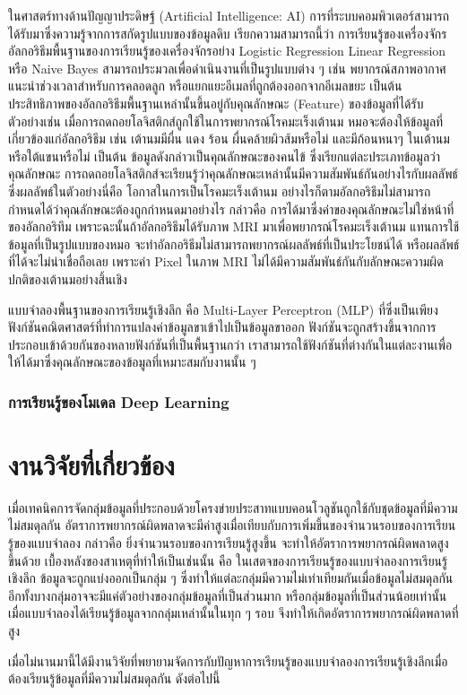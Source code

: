 ในศาสตร์ทางด้านปัญญาประดิษฐ์ (Artificial Intelligence: AI) การที่ระบบคอมพิวเตอร์สามารถได้รับมาซึ่งความรู้จากการสกัดรูปแบบของข้อมูลดิบ 
เรียกความสามารถนี้ว่า การเรียนรู้ของเครื่องจักร อัลกอริธึมพื้นฐานของการเรียนรู้ของเครื่องจักรอย่าง Logistic Regression 
Linear Regression หรือ Naive Bayes สามารถประมวลเพื่อดำเนินงานที่เป็นรูปแบบต่าง ๆ เช่น พยากรณ์สภาพอากาศ 
แนะนำช่วงเวลาสำหรับการคลอดลูก หรือแยกแยะอีเมลที่ถูกต้องออกจากอีเมลขยะ เป็นต้น ประสิทธิภาพของอัลกอริธึมพื้นฐานเหล่านั้นขึ้นอยู่กับคุณลักษณะ (Feature) ของข้อมูลที่ได้รับ ตัวอย่างเช่น เมื่อการถดถอยโลจิสติกส์ถูกใช้ในการพยากรณ์โรคมะเร็งเต้านม หมอจะต้องให้ข้อมูลที่เกี่ยวข้องแก่อัลกอริธึม 
เช่น เต้านมมีผื่น แดง ร้อน ผื่นคล้ายผิวส้มหรือไม่ และมีก้อนหนาๆ ในเต้านมหรือใต้แขนหรือไม่ เป็นต้น ข้อมูลดังกล่าวเป็นคุณลักษณะของคนไข้ 
ซึ่งเรียกแต่ละประเภทข้อมูลว่า คุณลักษณะ การถดถอยโลจิสติกส์จะเรียนรู้ว่าคุณลักษณะเหล่านั้นมีความสัมพันธ์กันอย่างไรกับผลลัพธ์ ซึ่งผลลัพธ์ในตัวอย่างนี่คือ 
โอกาสในการเป็นโรคมะเร็งเต้านม อย่างไรก็ตามอัลกอริธึมไม่สามารถกำหนดได้ว่าคุณลักษณะต้องถูกกำหนดมาอย่างไร กล่าวคือ 
การได้มาซึ่งค่าของคุณลักษณะไม่ใช่หน้าที่ของอัลกอริทึม เพราะฉะนั้นถ้าอัลกอริธึมได้รับภาพ MRI มาเพื่อพยากรณ์โรคมะเร็งเต้านม แทนการใช้ข้อมูลที่เป็นรูปแบบของหมอ 
จะทำอัลกอริธีมไม่สามารถพยากรณ์ผลลัพธ์ที่เป็นประโยชน์ได้ หรือผลลัพธ์ที่ได้จะไม่น่าเชื่อถือเลย เพราะค่า Pixel ในภาพ MRI 
ไม่ได้มีความสัมพันธ์กันกับลักษณะความผิดปกติของเต้านมอย่างสิ้นเชิง

แบบจำลองพื้นฐานของการเรียนรู้เชิงลึก คือ Multi-Layer Perceptron (MLP) ที่ซึ่งเป็นเพียงฟังก์ชันคณิตศาสตร์ที่ทำการแปลงค่าข้อมูลขาเข้าไปเป็นข้อมูลขาออก ฟังก์ชันจะถูกสร้างขึ้นจากการประกอบเข้าด้วยกันของหลายฟังก์ชันที่เป็นพื้นฐานกว่า 
เราสามารถใช้ฟังก์ชันที่ต่างกันในแต่ละงานเพื่อให้ได้มาซึ่งคุณลักษณะของข้อมูลที่เหมาะสมกับงานนั้น ๆ

\subsubsection{การเรียนรู้ของโมเดล Deep Learning}

\section{งานวิจัยที่เกี่ยวข้อง}
เมื่อเทคนิคการจัดกลุ่มข้อมูลที่ประกอบด้วยโครงข่ายประสาทแบบคอนโวลูชันถูกใช้กับชุดข้อมูลที่มีความไม่สมดุลกัน อัตราการพยากรณ์ผิดพลาดจะมีค่าสูงเมื่อเทียบกับการเพิ่มขึ้นของจำนวนรอบของการเรียนรู้ของแบบจำลอง กล่าวคือ ยิ่งจำนวนรอบของการเรียนรู้สูงขึ้น จะทำให้อัตราการพยากรณ์ผิดพลาดสูงขึ้นด้วย \cite{Yan:2015} เบื้องหลังของสาเหตุที่ทำให้เป็นเช่นนั้น คือ ในเสตจของการเรียนรู้ของแบบจำลองการเรียนรู้เชิงลึก ข้อมูลจะถูกแบ่งออกเป็นกลุ่ม ๆ ซึ่งทำให้แต่ละกลุ่มมีความไม่เท่าเทียมกันเมื่อข้อมูลไม่สมดุลกัน อีกทั้งบางกลุ่มอาจจะมีแค่ตัวอย่างของกลุ่มข้อมูลที่เป็นส่วนมาก หรือกลุ่มข้อมูลที่เป็นส่วนน้อยเท่านั้น เมื่อแบบจำลองได้เรียนรู้ข้อมูลจากกลุ่มเหล่านั้นในทุก ๆ รอบ จึงทำให้เกิดอัตราการพยากรณ์ผิดพลาดที่สูง

เมื่อไม่นานมานี้ได้มีงานวิจัยที่พยายามจัดการกับปัญหาการเรียนรู้ของแบบจำลองการเรียนรู้เชิงลึกเมื่อต้องเรียนรู้ข้อมูลที่มีความไม่สมดุลกัน ดังต่อไปนี้